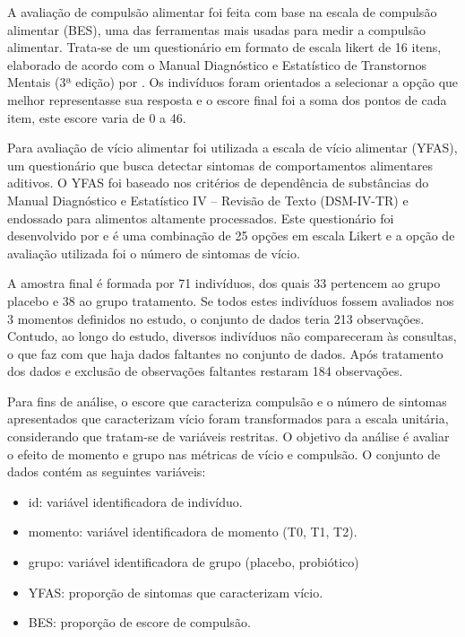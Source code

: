 \documentclass[AMA,STIX1COL]{WileyNJD-v2}
\begin{document}
A avaliação de compulsão alimentar foi feita com base na escala de compulsão alimentar (BES), uma das ferramentas mais usadas para medir a compulsão alimentar. Trata-se de um questionário em formato de escala likert de 16 itens, elaborado de acordo com o Manual Diagnóstico e Estatístico de Transtornos Mentais (3ª edição) \cite{spitzer1980diagnostic} por \cite{gormally1982assessment}. Os indivíduos foram orientados a selecionar a opção que melhor representasse sua resposta e o escore final foi a soma dos pontos de cada item, este escore varia de 0 a 46.

Para avaliação de vício alimentar foi utilizada a escala de vício alimentar (YFAS), um questionário que busca detectar sintomas de comportamentos alimentares aditivos. O YFAS foi baseado nos critérios de dependência de substâncias do Manual Diagnóstico e Estatístico IV – Revisão de Texto (DSM-IV-TR) \cite{segal2010diagnostic} e endossado para alimentos altamente processados. Este questionário foi desenvolvido por \cite{gearhardt2009preliminary} e é uma combinação de 25 opções em escala Likert e a opção de avaliação utilizada foi o número de sintomas de vício.


A amostra final é formada por 71 indivíduos, dos quais 33 pertencem ao grupo placebo e 38 ao grupo tratamento. Se todos estes indivíduos fossem avaliados nos 3 momentos definidos no estudo, o conjunto de dados teria 213 observações. Contudo, ao longo do estudo, diversos indivíduos não compareceram às consultas, o que faz com que haja dados faltantes no conjunto de dados. Após tratamento dos dados e exclusão de observações faltantes restaram 184 observações.


Para fins de análise, o escore que caracteriza compulsão e o número de sintomas apresentados que caracterizam vício foram transformados para a escala unitária, considerando que tratam-se de variáveis restritas. O objetivo da análise é avaliar o efeito de momento e grupo nas métricas de vício e compulsão. O conjunto de dados contém as seguintes variáveis:

\begin{itemize}
  \item id: variável identificadora de indivíduo.
  \item momento: variável identificadora de momento (T0, T1, T2).
  \item grupo: variável identificadora de grupo (placebo, probiótico)
  \item YFAS: proporção de sintomas que caracterizam vício.
  \item BES: proporção de escore de compulsão.
\end{itemize}
\end{document}

